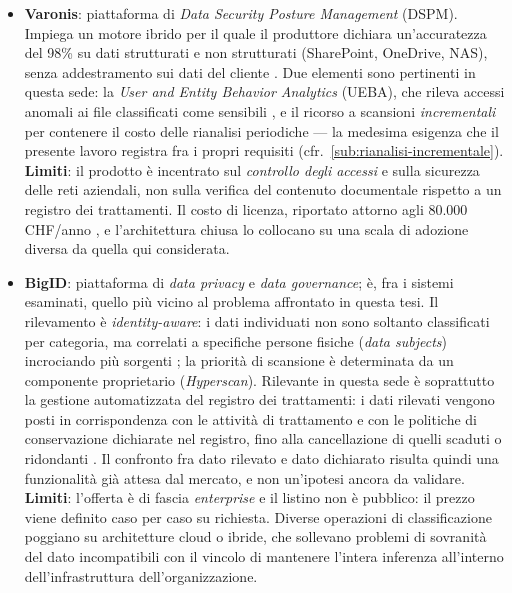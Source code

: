 \begin{itemize}
	\item \textbf{Varonis}: piattaforma di \textit{Data Security Posture Management} (DSPM). Impiega un motore ibrido per il quale il produttore dichiara un'accuratezza del 98\% su dati strutturati e non strutturati (SharePoint, OneDrive, NAS), senza addestramento sui dati del cliente \cite{OverviewVaronisAIPowereda}. Due elementi sono pertinenti in questa sede: la \textit{User and Entity Behavior Analytics} (UEBA), che rileva accessi anomali ai file classificati come sensibili \cite{DataClassificationBuyers}, e il ricorso a scansioni \textit{incrementali} per contenere il costo delle rianalisi periodiche --- la medesima esigenza che il presente lavoro registra fra i propri requisiti (cfr.~\ref{sub:rianalisi-incrementale}). \\
	      \textbf{Limiti}: il prodotto è incentrato sul \textit{controllo degli accessi} e sulla sicurezza delle reti aziendali, non sulla verifica del contenuto documentale rispetto a un registro dei trattamenti. Il costo di licenza, riportato attorno agli 80.000 CHF/anno \cite{VaronisSoftwarePricing}, e l'architettura chiusa lo collocano su una scala di adozione diversa da quella qui considerata.
	\item \textbf{BigID}: piattaforma di \textit{data privacy} e \textit{data governance}; è, fra i sistemi esaminati, quello più vicino al problema affrontato in questa tesi. Il rilevamento è \textit{identity-aware}: i dati individuati non sono soltanto classificati per categoria, ma correlati a specifiche persone fisiche (\textit{data subjects}) incrociando più sorgenti \cite{BigIDPersonIdentification}; la priorità di scansione è determinata da un componente proprietario (\textit{Hyperscan}). Rilevante in questa sede è soprattutto la gestione automatizzata del registro dei trattamenti: i dati rilevati vengono posti in corrispondenza con le attività di trattamento e con le politiche di conservazione dichiarate nel registro, fino alla cancellazione di quelli scaduti o ridondanti \cite{BigIDPrivacySuite}. Il confronto fra dato rilevato e dato dichiarato risulta quindi una funzionalità già attesa dal mercato, e non un'ipotesi ancora da validare. \\
	      \textbf{Limiti}: l'offerta è di fascia \textit{enterprise} e il listino non è pubblico: il prezzo viene definito caso per caso su richiesta. Diverse operazioni di classificazione poggiano su architetture cloud o ibride, che sollevano problemi di sovranità del dato incompatibili con il vincolo di mantenere l'intera inferenza all'interno dell'infrastruttura dell'organizzazione.

\end{itemize}
